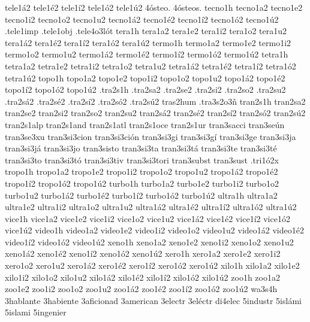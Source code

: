 {tele1á2 tele1é2 tele1í2 tele1ó2 tele1ú2
4ósteo.
4ósteos.
tecno1h
tecno1a2 tecno1e2 tecno1i2 tecno1o2 tecno1u2
tecno1á2 tecno1é2 tecno1í2 tecno1ó2 tecno1ú2
.tele1imp
.tele1obj
.tele4o3lót
tera1h
tera1a2 tera1e2 tera1i2 tera1o2 tera1u2
tera1á2 tera1é2 tera1í2 tera1ó2 tera1ú2
termo1h
termo1a2 termo1e2 termo1i2 termo1o2 termo1u2
termo1á2 termo1é2 termo1í2 termo1ó2 termo1ú2
tetra1h
tetra1a2 tetra1e2 tetra1i2 tetra1o2 tetra1u2
tetra1á2 tetra1é2 tetra1í2 tetra1ó2 tetra1ú2
topo1h
topo1a2 topo1e2 topo1i2 topo1o2 topo1u2
topo1á2 topo1é2 topo1í2 topo1ó2 topo1ú2
.tra2s1h
.tra2sa2 .tra2se2 .tra2si2 .tra2so2 .tra2su2
.tra2sá2 .tra2sé2 .tra2sí2 .tra2só2 .tra2sú2
tras2hum
.tra3s2o3ñ
tran2s1h
tran2sa2 tran2se2 tran2si2 tran2so2 tran2su2
tran2sá2 tran2sé2 tran2sí2 tran2só2 tran2sú2
tran2s1alp
tran2s1and
tran2s1atl
tran2s1oce
tran2s1ur
tran3sacci
tran3seún
tran3se3xu
tran3si3cion
tran3si3ción
tran3si3gi
tran3si3gí
tran3si3ge
tran3si3ja
tran3si3já
tran3si3jo
tran3sisto
tran3si3ta
tran3si3tá
tran3si3te
tran3si3té
tran3si3to
tran3si3tó
tran3si3tiv
tran3si3tori
tran3subst
tran3sust
.tri1ó2x
tropo1h
tropo1a2 tropo1e2 tropo1i2 tropo1o2 tropo1u2
tropo1á2 tropo1é2 tropo1í2 tropo1ó2 tropo1ú2
turbo1h
turbo1a2 turbo1e2 turbo1i2 turbo1o2 turbo1u2
turbo1á2 turbo1é2 turbo1í2 turbo1ó2 turbo1ú2
ultra1h
ultra1a2 ultra1e2 ultra1i2 ultra1o2 ultra1u2
ultra1á2 ultra1é2 ultra1í2 ultra1ó2 ultra1ú2
vice1h
vice1a2 vice1e2 vice1i2 vice1o2 vice1u2
vice1á2 vice1é2 vice1í2 vice1ó2 vice1ú2
video1h
video1a2 video1e2 video1i2 video1o2 video1u2
video1á2 video1é2 video1í2 video1ó2 video1ú2
xeno1h
xeno1a2 xeno1e2 xeno1i2 xeno1o2 xeno1u2
xeno1á2 xeno1é2 xeno1í2 xeno1ó2 xeno1ú2
xero1h
xero1a2 xero1e2 xero1i2 xero1o2 xero1u2
xero1á2 xero1é2 xero1í2 xero1ó2 xero1ú2
xilo1h
xilo1a2 xilo1e2 xilo1i2 xilo1o2 xilo1u2
xilo1á2 xilo1é2 xilo1í2 xilo1ó2 xilo1ú2
zoo1h
zoo1a2 zoo1e2 zoo1i2 zoo1o2 zoo1u2
zoo1á2 zoo1é2 zoo1í2 zoo1ó2 zoo1ú2
wa3s4h
3hablante
3habiente
3aficionad
3american
3electr
3eléctr
di4elec
5industr
5islámi
5islami
5ingenier
}
